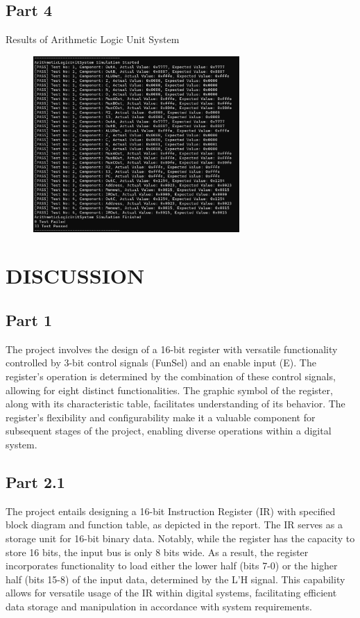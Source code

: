 \documentclass[pdftex,12pt,a4paper]{article}
\begin{document}
\subsection{Part 4}
Results of Arithmetic Logic Unit System \par
\begin{figure}[H]
	\centering
	\includegraphics[width=0.7\textwidth]{ALUSys}
\end{figure}
\section{DISCUSSION}
\subsection{Part 1}
The project involves the design of a 16-bit register with versatile functionality controlled by 3-bit control signals (FunSel) and an enable input (E). The register's operation is determined by the combination of these control signals, allowing for eight distinct functionalities. The graphic symbol of the register, along with its characteristic table, facilitates understanding of its behavior. The register's flexibility and configurability make it a valuable component for subsequent stages of the project, enabling diverse operations within a digital system.
\newpage
\subsection{Part 2.1}
The project entails designing a 16-bit Instruction Register (IR) with specified block diagram and function table, as depicted in the report. The IR serves as a storage unit for 16-bit binary data. Notably, while the register has the capacity to store 16 bits, the input bus is only 8 bits wide. As a result, the register incorporates functionality to load either the lower half (bits 7-0) or the higher half (bits 15-8) of the input data, determined by the L'H signal. This capability allows for versatile usage of the IR within digital systems, facilitating efficient data storage and manipulation in accordance with system requirements.
\end{document}
